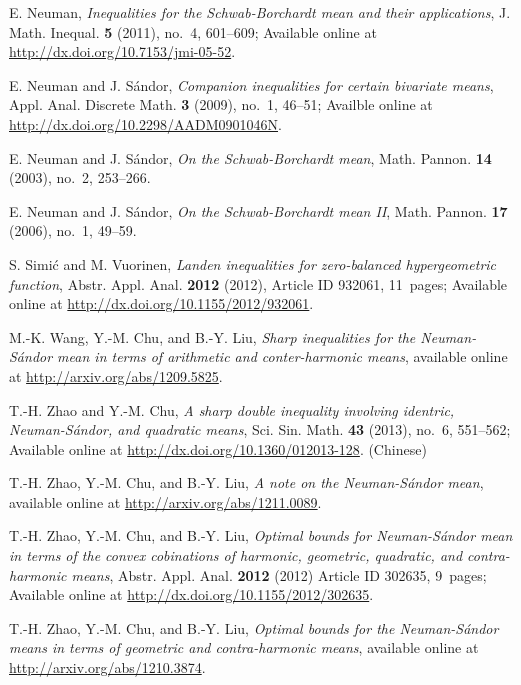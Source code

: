 \documentclass[reqno,a4paper]{amsart}
\numberwithin{equation}{section}
\theoremstyle{plain}
\theoremstyle{remark}
\begin{document}
\begin{thebibliography}{99}
E. Neuman, \textit{Inequalities for the Schwab-Borchardt mean and their applications}, J. Math. Inequal. \textbf{5} (2011), no.~4, 601\nobreakdash--609; Available online at \url{http://dx.doi.org/10.7153/jmi-05-52}.

E. Neuman and J. S\'andor, \textit{Companion inequalities for certain bivariate means}, Appl. Anal. Discrete Math. \textbf{3} (2009), no.~1, 46\nobreakdash--51; Availble online at \url{http://dx.doi.org/10.2298/AADM0901046N}.

E. Neuman and J. S\'andor, \textit{On the Schwab-Borchardt mean}, Math. Pannon. \textbf{14} (2003), no.~2, 253\nobreakdash--266.

E. Neuman and J. S\'andor, \textit{On the Schwab-Borchardt mean II}, Math. Pannon. \textbf{17} (2006), no.~1, 49\nobreakdash--59.

S. Simi\'c and M. Vuorinen, \textit{Landen inequalities for zero-balanced hypergeometric function}, Abstr. Appl. Anal. \textbf{2012} (2012), Article ID 932061, 11~pages; Available online at \url{http://dx.doi.org/10.1155/2012/932061}.

M.-K. Wang, Y.-M. Chu, and B.-Y. Liu, \textit{Sharp inequalities for the Neuman-S\'andor mean in terms of arithmetic and conter-harmonic means}, available online at \url{http://arxiv.org/abs/1209.5825}.

T.-H. Zhao and Y.-M. Chu, \textit{A sharp double inequality involving identric, Neuman-S\'andor, and quadratic means}, Sci. Sin. Math. \textbf{43} (2013), no.~6, 551\nobreakdash--562; Available online at \url{http://dx.doi.org/10.1360/012013-128}. (Chinese)

T.-H. Zhao, Y.-M. Chu, and B.-Y. Liu, \textit{A note on the Neuman-S\'andor mean}, available online at \url{http://arxiv.org/abs/1211.0089}.

T.-H. Zhao, Y.-M. Chu, and B.-Y. Liu, \textit{Optimal bounds for Neuman-S\'andor mean in terms of the convex cobinations of harmonic, geometric, quadratic, and contra-harmonic means}, Abstr. Appl. Anal. \textbf{2012} (2012) Article ID 302635, 9~pages; Available online at \url{http://dx.doi.org/10.1155/2012/302635}.

T.-H. Zhao, Y.-M. Chu, and B.-Y. Liu, \textit{Optimal bounds for the Neuman-S\'andor means in terms of geometric and contra-harmonic means}, available online at \url{http://arxiv.org/abs/1210.3874}.

\end{thebibliography}
\end{document}
